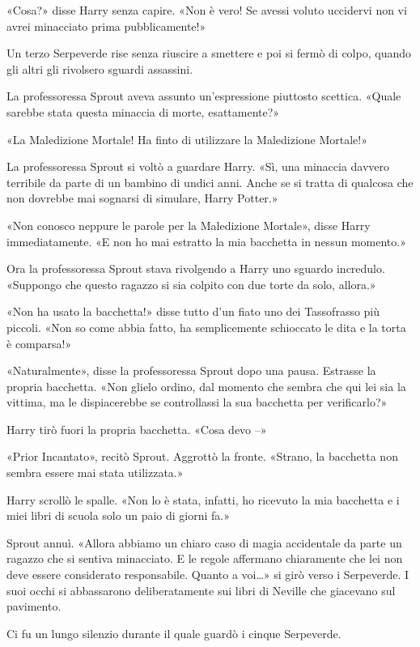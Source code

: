 «Cosa?» disse Harry senza capire. «Non è vero! Se avessi voluto uccidervi non vi avrei minacciato prima pubblicamente!»

Un terzo Serpeverde rise senza riuscire a smettere e poi si fermò di colpo, quando gli altri gli rivolsero sguardi assassini.

La professoressa Sprout aveva assunto un’espressione piuttosto scettica. «Quale sarebbe stata questa minaccia di morte, esattamente?»

«La Maledizione Mortale! Ha finto di utilizzare la Maledizione Mortale!»

La professoressa Sprout si voltò a guardare Harry. «Sì, una minaccia davvero terribile da parte di un bambino di undici anni. Anche se si tratta di qualcosa che non dovrebbe mai sognarsi di simulare, Harry Potter.»

«Non conosco neppure le parole per la Maledizione Mortale», disse Harry immediatamente. «E non ho mai estratto la mia bacchetta in nessun momento.»

Ora la professoressa Sprout stava rivolgendo a Harry uno sguardo incredulo. «Suppongo che questo ragazzo si sia colpito con due torte da solo, allora.»

«Non ha usato la bacchetta!» disse tutto d’un fiato uno dei Tassofrasso più piccoli. «Non so come abbia fatto, ha semplicemente schioccato le dita e la torta è comparsa!»

«Naturalmente», disse la professoressa Sprout dopo una pausa. Estrasse la propria bacchetta. «Non glielo ordino, dal momento che sembra che qui lei sia la vittima, ma le dispiacerebbe se controllassi la sua bacchetta per verificarlo?»

Harry tirò fuori la propria bacchetta. «Cosa devo –»

«Prior Incantato», recitò Sprout. Aggrottò la fronte. «Strano, la bacchetta non sembra essere mai stata utilizzata.»

Harry scrollò le spalle. «Non lo è stata, infatti, ho ricevuto la mia bacchetta e i miei libri di scuola solo un paio di giorni fa.»

Sprout annuì. «Allora abbiamo un chiaro caso di magia accidentale da parte un ragazzo che si sentiva minacciato. E le regole affermano chiaramente che lei non deve essere considerato responsabile. Quanto a voi…» si girò verso i Serpeverde. I suoi occhi si abbassarono deliberatamente sui libri di Neville che giacevano sul pavimento.

Ci fu un lungo silenzio durante il quale guardò i cinque Serpeverde.

